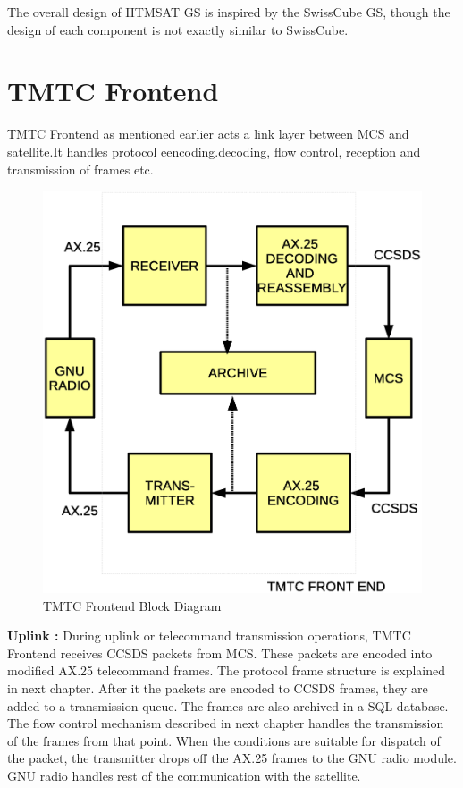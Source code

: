 \documentclass[BTech]{iitmdiss}
\begin{document}
\par The overall design of IITMSAT GS is inspired by the SwissCube GS, though the design of each component is not exactly similar to SwissCube.  

\section{TMTC Frontend}
TMTC Frontend as mentioned earlier acts a link layer between MCS and satellite.It handles protocol eencoding.decoding, flow control, reception and transmission of frames etc.

\begin{figure}[H]
\includegraphics[scale = 0.6]{tmtc.eps}
\caption{TMTC Frontend Block Diagram}
\label{fig:tmtc}
\end{figure}


\textbf{Uplink : }During uplink or telecommand transmission operations, TMTC Frontend receives CCSDS packets from MCS. These packets are encoded into modified AX.25 telecommand frames. The protocol frame structure is explained in next chapter. After it the packets are encoded to CCSDS frames, they are added to a transmission queue. The frames are also archived in a SQL database. The flow control mechanism described in next chapter handles the transmission of the frames from that point. When the conditions are suitable for dispatch of the packet, the transmitter drops off the AX.25 frames to the GNU radio module. GNU radio handles rest of the communication with the satellite.
\end{document}
